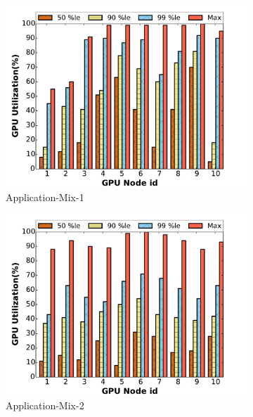 \begin{figure}[!tbp]
\begin{subfigure}[b]{0.33\textwidth}
  \centering
  \includegraphics[width=1.1\linewidth]{results/app1-high.pdf}
  \caption{Application-Mix-1}
  \label{fig:app1}
\end{subfigure}
\begin{subfigure}[b]{.33\textwidth}
  \centering
  \includegraphics[width=1.1\linewidth]{results/app2-med.pdf}
  \caption{Application-Mix-2}
  \label{fig:app2}
\end{subfigure}
\begin{subfigure}[b]{.33\textwidth}
  \centering

\end{subfigure}
\end{figure}
